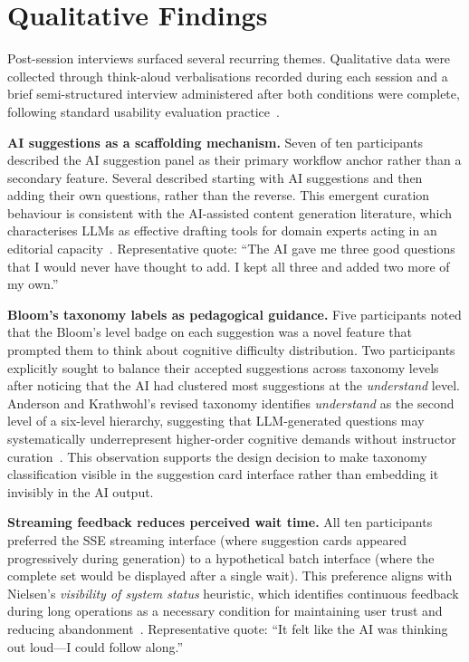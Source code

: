 \section{Qualitative Findings}

Post-session interviews surfaced several recurring themes. Qualitative data
were collected through think-aloud verbalisations recorded during each session
and a brief semi-structured interview administered after both conditions
were complete, following standard usability evaluation
practice~\cite{nielsen1994}.

\textbf{AI suggestions as a scaffolding mechanism.} Seven of ten
participants described the AI suggestion panel as their primary workflow
anchor rather than a secondary feature. Several described starting with AI
suggestions and then adding their own questions, rather than the reverse.
This emergent curation behaviour is consistent with the AI-assisted content
generation literature, which characterises LLMs as effective drafting tools
for domain experts acting in an editorial capacity~\cite{brown2020}.
Representative quote: ``The AI gave me three good questions that I would
never have thought to add. I kept all three and added two more of my own.''

\textbf{Bloom's taxonomy labels as pedagogical guidance.} Five participants
noted that the Bloom's level badge on each suggestion was a novel feature
that prompted them to think about cognitive difficulty distribution. Two
participants explicitly sought to balance their accepted suggestions across
taxonomy levels after noticing that the AI had clustered most suggestions at
the \emph{understand} level. Anderson and Krathwohl's revised taxonomy
identifies \emph{understand} as the second level of a six-level hierarchy,
suggesting that LLM-generated questions may systematically underrepresent
higher-order cognitive demands without instructor curation~\cite{anderson2001}.
This observation supports the design decision to make taxonomy classification
visible in the suggestion card interface rather than embedding it invisibly
in the AI output.

\textbf{Streaming feedback reduces perceived wait time.} All ten participants
preferred the SSE streaming interface (where suggestion cards appeared
progressively during generation) to a hypothetical batch interface (where
the complete set would be displayed after a single wait). This preference
aligns with Nielsen's \emph{visibility of system status} heuristic, which
identifies continuous feedback during long operations as a necessary
condition for maintaining user trust and reducing abandonment~\cite{nielsen1994}.
Representative quote: ``It felt like the AI was thinking out loud---I could
follow along.''

